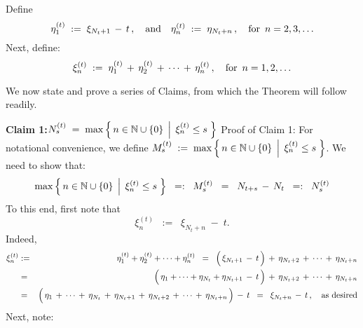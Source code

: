 Define
\begin{equation*}
\eta^{(t)}_{1} \; := \; \xi_{N_{t}+1} \,-\, t\,,
\quad\textnormal{and}\quad
\eta^{(t)}_{n} \; := \; \eta_{N_{t}+n}\,,
\quad\textnormal{for \,$n = 2, 3, \ldots$}
\end{equation*}
Next, define:
\begin{equation*}
\xi^{(t)}_{n} \; := \; \eta^{(t)}_{1} \,+\, \eta^{(t)}_{2} \,+\, \cdots \,+\, \eta^{(t)}_{n}\,,
\quad\textnormal{for \,$n = 1, 2, \ldots$}
\end{equation*}

\vskip 0.5cm
\noindent
We now state and prove a series of Claims, from which the Theorem will follow readily.

\vskip 0.5cm
\noindent
\textbf{Claim 1:}\quad $N^{(t)}_{s} \; = \; \max\left\{\,n\in\mathbb{N}\cup\{0\}\;\left\vert\;\,\xi^{(t)}_{n} \leq s\right.\,\right\}$
\vskip 0.2cm
\noindent
Proof of Claim 1:\quad
For notational convenience, we define
$M^{(t)}_{s} \; := \; \max\left\{\,n\in\mathbb{N}\cup\{0\}\;\left\vert\;\,\xi^{(t)}_{n} \leq s\right.\,\right\}$.
We need to show that:
\begin{equation*}
\max\left\{\,n\in\mathbb{N}\cup\{0\}\;\left\vert\;\,\xi^{(t)}_{n} \leq s\right.\,\right\}
\;\; =: \;\;
	M^{(t)}_{s}
\;\; = \;\;
	N_{t+s} \,-\, N_{t}
\;\; =: \;\;
	N^{(t)}_{s}
\end{equation*}
To this end, first note that
\begin{equation}\label{xitn}
\xi^{(t)}_{n} \;\; := \;\; \xi_{N_{t}+n} \;-\; t.
\end{equation}
Indeed,
\begin{eqnarray*}
\xi^{(t)}_{n}
& := &
	\eta^{(t)}_{1} + \eta^{(t)}_{2} + \cdots + \eta^{(t)}_{n}
\;\; = \;\;
	\left(\,\xi_{N_{t}+1} \,\overset{{\color{white}.}}{-}\, t\,\right)
	\, + \,
	\eta_{N_{t}+2}
	\, + \,
	\cdots
	\, + \,
	\eta_{N_{t}+n}
\\
& = &
	\left(\,\eta_{1} + \cdots +  \eta_{N_{t}} +\eta_{N_{t}+1} \,\overset{{\color{white}.}}{-}\, t\,\right)
	\, + \,
	\eta_{N_{t}+2}
	\, + \,
	\cdots
	\, + \,
	\eta_{N_{t}+n}
\\
& = &
	\left(\,\eta_{1} \,\overset{{\color{white}.}}{+}\, \cdots \,+\,  \eta_{N_{t}}
	\,+\, \eta_{N_{t}+1} \,+\, \eta_{N_{t}+2} \,+\, \cdots\,+\, \eta_{N_{t}+n}
	\,\right)
	\, - \,
	t
\;\; = \;\;
	\xi_{N_{t}+n} \,-\, t\,,
	\quad
	\textnormal{as desired}
\end{eqnarray*}
Next, note:
